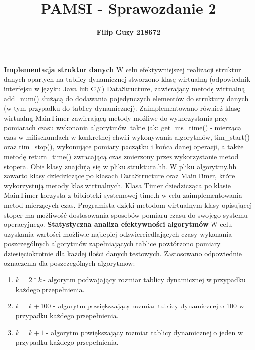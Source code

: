 \documentclass[10pt, a4paper]{article}
\title{\textbf{PAMSI - Sprawozdanie 2}}
\author{\textbf{Filip Guzy 218672}}
\begin{document}
\maketitle

\begin{flushleft}
\textbf{Implementacja struktur danych} \newline \newline
W celu efektywniejszej realizacji struktur danych opartych na tablicy dynamicznej stworzono klasę wirtualną (odpowiednik interfejsu w języku Java lub C\#) DataStructure, zawierający metodę wirtualną add\_num() służącą do dodawania pojedynczych elementów do struktury danych (w tym przypadku do tablicy dynamicznej). Zaimplementowano również klasę wirtualną MainTimer zawierającą metody możliwe do wykorzystania przy pomiarach czasu wykonania algorytmów, takie jak: get\_ms\_time() - mierzącą czas w milisekundach w konkretnej chwili wykonywania algorytmów, tim\_start() oraz tim\_stop(), wykonujące pomiary początku i końca danej operacji, a także metodę return\_time() zwracającą czas zmierzony przez wykorzystanie metod stopera. Obie klasy znajdują się w pliku struktura.hh. W pliku algorytmy.hh zawarto klasy dziedziczące po klasach DataStructure oraz MainTimer, które wykorzystują metody klas wirtualnych. Klasa Timer dziedzicząca po klasie MainTimer korzysta z biblioteki systemowej time.h w celu zaimplementowania metod mierzących czas. Programista dzięki metodom wirtualnym klasy opisującej stoper ma możliwość dostosowania sposobów pomiaru czasu do swojego systemu operacyjnego. \newline \newline
\textbf{Statystyczna analiza efektywności algorytmów} \newline \newline
W celu uzyskania wartości możliwie najlepiej odzwierciedlających czasy wykonania poszczególnych algorytmów zapełniających tablice powtórzono pomiary dziesięciokrotnie dla każdej ilości danych testowych. Zastosowano odpowiednie oznaczenia dla poszczególnych algorytmów:

\begin{enumerate}
\item $k=2*k$ - algorytm podwajający rozmiar tablicy dynamicznej w przypadku każdego przepełnienia.
\item $k=k+100$ - algorytm powiększający rozmiar tablicy dynamicznej o 100 w przypadku każdego przepełnienia.
\item $k=k+1$ - algorytm powiększający rozmiar tablicy dynamicznej o jeden w przypadku każdego przepełnienia.
\end{enumerate}


\end{flushleft}
\end{document}
